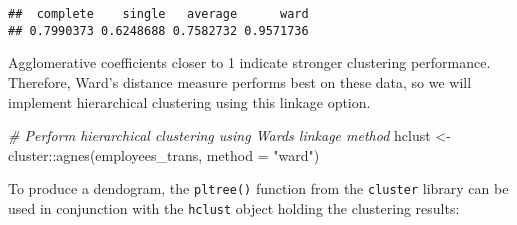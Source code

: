\documentclass[
]{book}
\newenvironment{Shaded}{\begin{snugshade}}{\end{snugshade}}
\newcommand{\AttributeTok}[1]{\textcolor[rgb]{0.77,0.63,0.00}{#1}}
\newcommand{\CommentTok}[1]{\textcolor[rgb]{0.56,0.35,0.01}{\textit{#1}}}
\newcommand{\ControlFlowTok}[1]{\textcolor[rgb]{0.13,0.29,0.53}{\textbf{#1}}}
\newcommand{\FunctionTok}[1]{\textcolor[rgb]{0.00,0.00,0.00}{#1}}
\newcommand{\NormalTok}[1]{#1}
\newcommand{\OtherTok}[1]{\textcolor[rgb]{0.56,0.35,0.01}{#1}}
\newcommand{\SpecialCharTok}[1]{\textcolor[rgb]{0.00,0.00,0.00}{#1}}
\newcommand{\StringTok}[1]{\textcolor[rgb]{0.31,0.60,0.02}{#1}}
\begin{document}
\begin{Shaded}
\end{Shaded}

\begin{verbatim}
##  complete    single   average      ward 
## 0.7990373 0.6248688 0.7582732 0.9571736
\end{verbatim}

Agglomerative coefficients closer to 1 indicate stronger clustering performance. Therefore, Ward's distance measure performs best on these data, so we will implement hierarchical clustering using this linkage option.

\begin{Shaded}
\begin{Highlighting}[]
\CommentTok{\# Perform hierarchical clustering using Ward\textquotesingle{}s linkage method}
\NormalTok{hclust }\OtherTok{\textless{}{-}}\NormalTok{ cluster}\SpecialCharTok{::}\FunctionTok{agnes}\NormalTok{(employees\_trans, }\AttributeTok{method =} \StringTok{"ward"}\NormalTok{)}
\end{Highlighting}
\end{Shaded}

To produce a dendogram, the \texttt{pltree()} function from the \texttt{cluster} library can be used in conjunction with the \texttt{hclust} object holding the clustering results:
\end{document}
